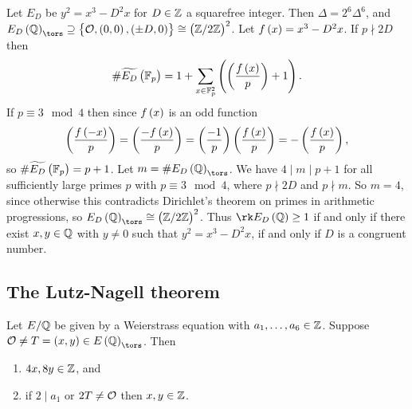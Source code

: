 \begin{example*}
Let $ E_D $ be $ y^2 = x^3 - D^2x $ for $ D \in \mathbb{Z} $ a squarefree integer. Then $ \Delta = 2^6\Delta^6 $, and $ E_D\br{\QQ}_{\tors} \supseteq \cbr{\OOO, \br{0, 0}, \br{\pm D, 0}} \cong \br{\ZZ / 2\ZZ}^2 $. Let $ f\br{x} = x^3 - D^2x $. If $ p \nmid 2D $ then
$$ \#\widetilde{E_D}\br{\FF_p} = 1 + \sum_{x \in \FF_p^2} \br{\br{\dfrac{f\br{x}}{p}} + 1}. $$
If $ p \equiv 3 \mod 4 $ then since $ f\br{x} $ is an odd function
$$ \br{\dfrac{f\br{-x}}{p}} = \br{\dfrac{-f\br{x}}{p}} = \br{\dfrac{-1}{p}}\br{\dfrac{f\br{x}}{p}} = -\br{\dfrac{f\br{x}}{p}}, $$
so $ \#\widetilde{E_D}\br{\FF_p} = p + 1 $. Let $ m = \#E_D\br{\QQ}_{\tors} $. We have $ 4 \mid m \mid p + 1 $ for all sufficiently large primes $ p $ with $ p \equiv 3 \mod 4 $, where $ p \nmid 2D $ and $ p \nmid m $. So $ m = 4 $, since otherwise this contradicts Dirichlet's theorem on primes in arithmetic progressions, so $ E_D\br{\QQ}_{\tors} \cong \br{\ZZ / 2\ZZ}^2 $. Thus $ \rk E_D\br{\QQ} \ge 1 $ if and only if there exist $ x, y \in \mathbb{Q} $ with $ y \ne 0 $ such that $ y^2 = x^3 - D^2x $, if and only if $ D $ is a congruent number.
\end{example*}

\pagebreak

\subsection{The Lutz-Nagell theorem}

\begin{lemma}
\label{lem:10.4}
Let $ E / \mathbb{Q} $ be given by a Weierstrass equation with $ a_1, \dots, a_6 \in \mathbb{Z} $. Suppose $ \OOO \ne T = \br{x, y} \in E\br{\QQ}_{\tors} $. Then
\begin{enumerate}
\item $ 4x, 8y \in \mathbb{Z} $, and
\item if $ 2 \mid a_1 $ or $ 2T \ne \mathcal{O} $ then $ x, y \in \mathbb{Z} $.
\end{enumerate}
\end{lemma}

